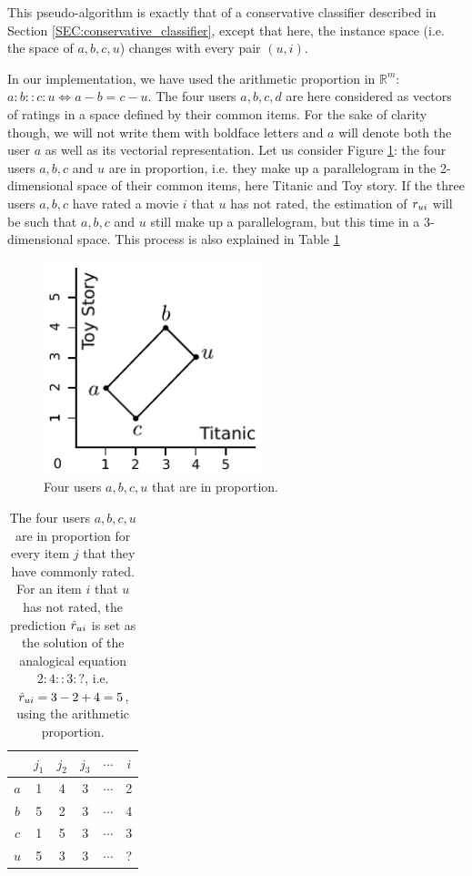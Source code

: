 This pseudo-algorithm is exactly that of a conservative classifier described in
Section \ref{SEC:conservative_classifier}, except that here, the instance space
(i.e. the space of $a, b, c, u$) changes with every pair $(u, i)$.

In our implementation, we have used the arithmetic proportion in
$\mathbb{R}^m$: $a:b::c:u \iff a - b = c - u$.
The four users $a, b, c, d$ are here considered as vectors of ratings in a
space defined by their common items. For the sake of clarity though, we will
not write them with boldface letters and $a$ will denote both the user $a$ as
well as its vectorial representation. Let us consider
Figure \ref{FIG:analogical_recommendation}: the four users $a, b, c$ and $u$
are in proportion, i.e. they make up a parallelogram in the 2-dimensional space of their
common items, here Titanic and Toy story. If the three users $a, b, c$ have
rated a movie $i$ that $u$ has not rated, the estimation of $r_{ui}$ will be such
that $a, b, c$ and $u$ still make up a parallelogram, but this time in a
3-dimensional space. This process is also explained in Table
\ref{TAB:analogical_recommendation}

\begin{figure}[!h]
\centering
  \includegraphics[width=2.5in]{figures/analogical_recommendation.pdf}
  \caption{Four users $a, b, c, u$ that are in proportion.}
\label{FIG:analogical_recommendation}
\end{figure}

\begin{table}[h!]
\centering
  \begin{tabular}{ c   c  c  c  c  c  }
\toprule
 & $j_1$ & $j_2$ & $j_3$ & $\cdots$ & $i$\\
  \midrule
$a$ & 1 & 4  & 3 & $\cdots$ & 2 \\
$b$ & 5 & 2  & 3 & $\cdots$ & 4 \\
$c$ & 1 & 5  & 3 & $\cdots$ & 3 \\
$u$ & 5 & 3  & 3 & $\cdots$ & ? \\
\bottomrule
\end{tabular}
\caption{The four users $a, b, c, u$ are in proportion for every item $j$ that
  they have commonly rated. For an item $i$ that $u$ has not rated, the
  prediction $\hat{r}_{ui}$ is set as the solution of the analogical equation
  $2:4::3:?$, i.e. $\hat{r}_{ui} = 3 - 2 + 4 = 5$, using the arithmetic proportion.}
\label{TAB:analogical_recommendation}
\end{table}

